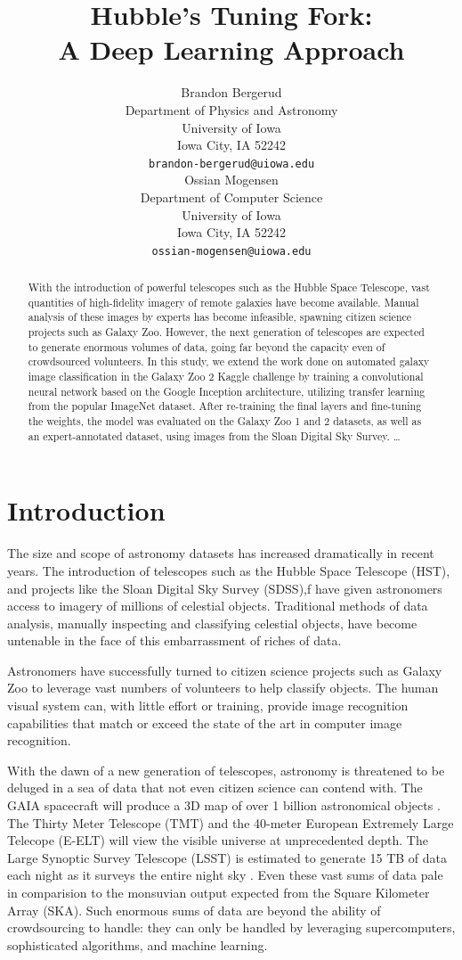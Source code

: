 \documentclass{article}
\title{Hubble's Tuning Fork: \\A Deep Learning Approach}
\author{
  Brandon Bergerud \\
  Department of Physics and Astronomy\\
  University of Iowa\\
  Iowa City, IA  52242 \\
  \texttt{brandon-bergerud@uiowa.edu} \\
  \And
  Ossian Mogensen \\
  Department of Computer Science \\
  University of Iowa \\
  Iowa City, IA  52242 \\
  \texttt{ossian-mogensen@uiowa.edu} \\
}
\begin{document}

\maketitle

\begin{abstract}
With the introduction of powerful telescopes such as the Hubble Space Telescope, vast quantities of high-fidelity imagery of remote galaxies have become available. Manual analysis of these images by experts has become infeasible, spawning citizen science projects such as Galaxy Zoo. However, the next generation of telescopes are expected to generate enormous volumes of data, going far beyond the capacity even of crowdsourced volunteers. In this study, we extend the work done on automated galaxy image classification in the Galaxy Zoo 2 Kaggle challenge by training a convolutional neural network based on the Google Inception architecture, utilizing transfer learning from the popular ImageNet dataset. After re-training the final layers and fine-tuning the weights, the model was evaluated on the Galaxy Zoo 1 and 2 datasets, as well as an expert-annotated dataset, using images from the Sloan Digital Sky Survey. \ldots
\end{abstract}

\section{Introduction}
The size and scope of astronomy datasets has increased dramatically in recent years. The introduction of telescopes such as the Hubble Space Telescope (HST), and projects like the Sloan Digital Sky Survey (SDSS),f have given astronomers access to imagery of millions of celestial objects. Traditional methods of data analysis, manually inspecting and classifying celestial objects, have become untenable in the face of this embarrassment of riches of data. 

Astronomers have successfully turned to citizen science projects such as Galaxy Zoo to leverage vast numbers of volunteers to help classify objects. The human visual system can, with little effort or training, provide image recognition capabilities that match or exceed the state of the art in computer image recognition. 

With the dawn of a new generation of telescopes, astronomy is threatened to be deluged in a sea of data that not even citizen science can contend with. The GAIA spacecraft will produce a 3D map of over 1 billion astronomical objects \citep{2016A&A...595A...1G}. The Thirty Meter Telescope (TMT) \citep{2015RAA....15.1945S} and the 40-meter European Extremely Large Telecope (E-ELT) will view the visible universe at unprecedented depth. The Large Synoptic Survey Telescope (LSST) is estimated to generate 15 TB of data each night as it surveys the entire night sky \citep{2009AAS...21346003I}. Even these vast sums of data pale in comparision to the monsuvian output expected from the Square Kilometer Array (SKA). Such enormous sums of data are beyond the ability of crowdsourcing to handle: they can only be handled by leveraging supercomputers, sophisticated algorithms, and machine learning.
\end{document}
